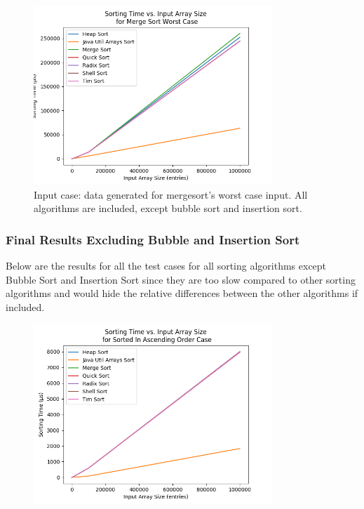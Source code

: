 \begin{figure}[!ht]
\centering
\includegraphics[width=9cm]{figures/plots_without_BubbleSort_InsertionSort/sorting_time_vs_input_array_size_MergeSortWorstCase.png}
\caption{Input case: data generated for mergesort's worst case input. All algorithms are included, except bubble sort and insertion sort.}
\label{fig:allButBubbleInsertionMergesortWorstCase}
\end{figure}

\subsubsection{Final Results Excluding Bubble and Insertion Sort}

Below are the results for all the test cases for all sorting algorithms except Bubble Sort and Insertion Sort since they are too slow compared to other sorting algorithms and would hide the relative differences between the other algorithms if included.

\begin{figure}[!htp]
\centering
\includegraphics[width=9cm]{figures/plots_without_BubbleSort_InsertionSort/sorting_time_vs_input_array_size_SortedInAscendingOrderCase.png}
\end{figure}

